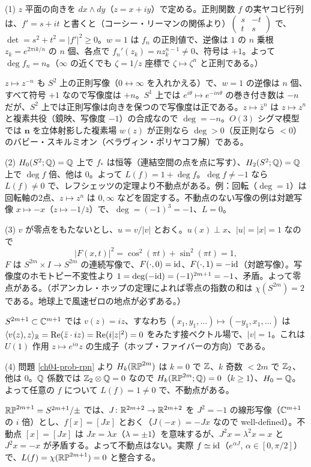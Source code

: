 \begin{solution}
(1) $z$ 平面の向きを $dx\wedge dy$（$z=x+iy$）で定める。正則関数 $f$ の実ヤコビ行列は、$f'=s+it$ と書くと（コーシー・リーマンの関係より）$\begin{pmatrix}s&-t\\t&s\end{pmatrix}$ で、$\det=s^2+t^2=\lvert f'\rvert^2\ge0$。$w=1$ は $f_n$ の正則値で、逆像は $1$ の $n$ 乗根 $z_k=e^{2\pi ik/n}$ の $n$ 個、各点で $f_n'(z_k)=nz_k^{n-1}\ne0$、符号は $+1$。よって $\deg f_n=n$。（$\infty$ の近くでも $\zeta=1/z$ 座標で $\zeta\mapsto\zeta^n$ と正則である。）

$z\mapsto z^{-n}$ も $S^2$ 上の正則写像（$0\leftrightarrow\infty$ を入れかえる）で、$w=1$ の逆像は $n$ 個、すべて符号 $+1$ なので写像度は $+n$。$S^1$ 上では $e^{i\theta}\mapsto e^{-in\theta}$ の巻き付き数は $-n$ だが、$S^2$ 上では正則写像は向きを保つので写像度は正である。$z\mapsto\bar z^n$ は $z\mapsto z^n$ と複素共役（鏡映、写像度 $-1$）の合成なので $\deg=-n$。$O(3)$ シグマ模型では $\bm n$ を立体射影した複素場 $w(z)$ が正則なら $\deg>0$（反正則なら $<0$）のバビー・スキルミオン（ベラヴィン・ポリヤコフ解）である。

(2) $H_0(S^2;\mathbb{Q})=\mathbb{Q}$ 上で $f_*$ は恒等（連結空間の点を点に写す）、$H_2(S^2;\mathbb{Q})=\mathbb{Q}$ 上で $\deg f$ 倍、他は $0$。よって $L(f)=1+\deg f$。$\deg f\ne-1$ なら $L(f)\ne0$ で、レフシェッツの定理より不動点がある。例：回転（$\deg=1$）は回転軸の2点、$z\mapsto z^n$ は $0,\infty$ などを固定する。不動点のない写像の例は対蹠写像 $x\mapsto-x$（$z\mapsto-1/\bar z$）で、$\deg=(-1)^3=-1$、$L=0$。

(3) $v$ が零点をもたないとし、$u=v/\lvert v\rvert$ とおく。$u(x)\perp x$、$\lvert u\rvert=\lvert x\rvert=1$ なので
\[
\lvert F(x,t)\rvert^2=\cos^2(\pi t)+\sin^2(\pi t)=1,
\]
$F$ は $S^{2m}\times I\to S^{2m}$ の連続写像で、$F(\cdot,0)=\mathrm{id}$、$F(\cdot,1)=-\mathrm{id}$（対蹠写像）。写像度のホモトピー不変性より $1=\deg(-\mathrm{id})=(-1)^{2m+1}=-1$、矛盾。よって零点がある。（ポアンカレ・ホップの定理によれば零点の指数の和は $\chi(S^{2m})=2$ である。地球上で風速ゼロの地点が必ずある。）

$S^{2m+1}\subset\mathbb{C}^{m+1}$ では $v(z)=iz$、すなわち $(x_1,y_1,\dots)\mapsto(-y_1,x_1,\dots)$ は $\langle v(z),z\rangle_{\mathbb{R}}=\mathrm{Re}(\bar z\cdot iz)=\mathrm{Re}(i\lvert z\rvert^2)=0$ をみたす接ベクトル場で、$\lvert v\rvert=1$。これは $U(1)$ 作用 $z\mapsto e^{i\alpha}z$ の生成子（ホップ・ファイバーの方向）である。

(4) 問題 \ref{ch04-prob-rpn} より $H_k(\mathbb{RP}^{2m})$ は $k=0$ で $\mathbb{Z}$、$k$ 奇数 $<2m$ で $\mathbb{Z}_2$、他は $0$。$\mathbb{Q}$ 係数では $\mathbb{Z}_2\otimes\mathbb{Q}=0$ なので $H_k(\mathbb{RP}^{2m};\mathbb{Q})=0$（$k\ge1$）、$H_0=\mathbb{Q}$。よって任意の $f$ について $L(f)=1\ne0$ で、不動点がある。

$\mathbb{RP}^{2m+1}=S^{2m+1}/\pm$ では、$J\colon\mathbb{R}^{2m+2}\to\mathbb{R}^{2m+2}$ を $J^2=-1$ の線形写像（$\mathbb{C}^{m+1}$ の $i$ 倍）とし、$f[x]=[Jx]$ とおく（$J(-x)=-Jx$ なので well-defined）。不動点 $[x]=[Jx]$ は $Jx=\lambda x$（$\lambda=\pm1$）を意味するが、$J^2x=\lambda^2x=x$ と $J^2x=-x$ が矛盾する。よって不動点はない。実際 $f\simeq\mathrm{id}$（$e^{\alpha J}$, $\alpha\in[0,\pi/2]$）で、$L(f)=\chi(\mathbb{RP}^{2m+1})=0$ と整合する。
\end{solution}

